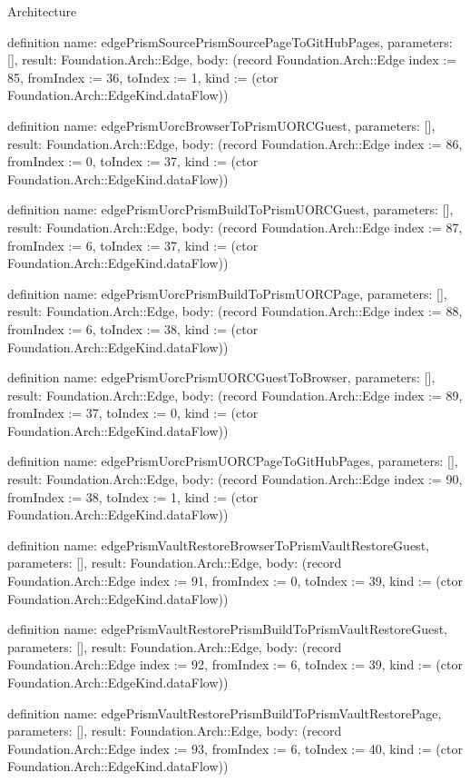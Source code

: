 \begin{lexlean}{Architecture}
\begin{semanticmodule}
definition{
  name: edgePrismSourcePrismSourcePageToGitHubPages,
  parameters: [],
  result: Foundation.Arch::Edge,
  body: (record Foundation.Arch::Edge {index := 85, fromIndex := 36, toIndex := 1, kind := (ctor Foundation.Arch::EdgeKind.dataFlow)})
}

definition{
  name: edgePrismUorcBrowserToPrismUORCGuest,
  parameters: [],
  result: Foundation.Arch::Edge,
  body: (record Foundation.Arch::Edge {index := 86, fromIndex := 0, toIndex := 37, kind := (ctor Foundation.Arch::EdgeKind.dataFlow)})
}

definition{
  name: edgePrismUorcPrismBuildToPrismUORCGuest,
  parameters: [],
  result: Foundation.Arch::Edge,
  body: (record Foundation.Arch::Edge {index := 87, fromIndex := 6, toIndex := 37, kind := (ctor Foundation.Arch::EdgeKind.dataFlow)})
}

definition{
  name: edgePrismUorcPrismBuildToPrismUORCPage,
  parameters: [],
  result: Foundation.Arch::Edge,
  body: (record Foundation.Arch::Edge {index := 88, fromIndex := 6, toIndex := 38, kind := (ctor Foundation.Arch::EdgeKind.dataFlow)})
}

definition{
  name: edgePrismUorcPrismUORCGuestToBrowser,
  parameters: [],
  result: Foundation.Arch::Edge,
  body: (record Foundation.Arch::Edge {index := 89, fromIndex := 37, toIndex := 0, kind := (ctor Foundation.Arch::EdgeKind.dataFlow)})
}

definition{
  name: edgePrismUorcPrismUORCPageToGitHubPages,
  parameters: [],
  result: Foundation.Arch::Edge,
  body: (record Foundation.Arch::Edge {index := 90, fromIndex := 38, toIndex := 1, kind := (ctor Foundation.Arch::EdgeKind.dataFlow)})
}

definition{
  name: edgePrismVaultRestoreBrowserToPrismVaultRestoreGuest,
  parameters: [],
  result: Foundation.Arch::Edge,
  body: (record Foundation.Arch::Edge {index := 91, fromIndex := 0, toIndex := 39, kind := (ctor Foundation.Arch::EdgeKind.dataFlow)})
}

definition{
  name: edgePrismVaultRestorePrismBuildToPrismVaultRestoreGuest,
  parameters: [],
  result: Foundation.Arch::Edge,
  body: (record Foundation.Arch::Edge {index := 92, fromIndex := 6, toIndex := 39, kind := (ctor Foundation.Arch::EdgeKind.dataFlow)})
}

definition{
  name: edgePrismVaultRestorePrismBuildToPrismVaultRestorePage,
  parameters: [],
  result: Foundation.Arch::Edge,
  body: (record Foundation.Arch::Edge {index := 93, fromIndex := 6, toIndex := 40, kind := (ctor Foundation.Arch::EdgeKind.dataFlow)})
}


\end{semanticmodule}
\end{lexlean}
